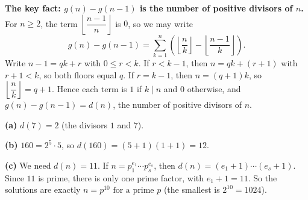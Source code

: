 \textbf{The key fact: $g(n)-g(n-1)$ is the number of positive divisors of $n$.} For $n\ge2$, the term $\left\lfloor\dfrac{n-1}{n}\right\rfloor$ is $0$, so we may write
\[g(n)-g(n-1)=\sum_{k=1}^{n}\left(\left\lfloor\dfrac nk\right\rfloor-\left\lfloor\dfrac{n-1}k\right\rfloor\right).\]
Write $n-1=qk+r$ with $0\le r<k$. If $r<k-1$, then $n=qk+(r+1)$ with $r+1<k$, so both floors equal $q$. If $r=k-1$, then $n=(q+1)k$, so $\left\lfloor\dfrac nk\right\rfloor=q+1$. Hence each term is $1$ if $k\mid n$ and $0$ otherwise, and $g(n)-g(n-1)=d(n)$, the number of positive divisors of $n$.

\textbf{(a)} $d(7)=\boxed{2}$ (the divisors $1$ and $7$).

\textbf{(b)} $160=2^5\cdot5$, so $d(160)=(5+1)(1+1)=\boxed{12}$.

\textbf{(c)} We need $d(n)=11$. If $n=p_1^{e_1}\cdots p_s^{e_s}$, then $d(n)=(e_1+1)\cdots(e_s+1)$. Since $11$ is prime, there is only one prime factor, with $e_1+1=11$. So the solutions are exactly $\boxed{n=p^{10}\text{ for a prime }p}$ (the smallest is $2^{10}=1024$).
